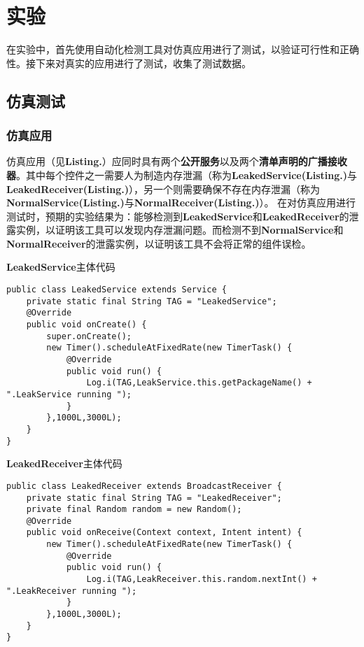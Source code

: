 
\chapter{实验}\label{chapter_experiment}

在实验中，首先使用自动化检测工具对仿真应用进行了测试，以验证可行性和正确性。接下来对真实的应用进行了测试，收集了测试数据。

\section{仿真测试}

\subsection{仿真应用}

仿真应用（见\textbf{Listing.}\redbf{\ref{code: manifest}}）应同时具有两个\textbf{公开服务}以及两个\textbf{清单声明的广播接收器}。其中每个控件之一需要人为制造内存泄漏（称为\textbf{LeakedService(Listing.\redbf{\ref{code:LeakedService}})}与\textbf{LeakedReceiver(Listing.\redbf{\ref{code:LeakedReceiver}})}），另一个则需要确保不存在内存泄漏（称为\textbf{NormalService(Listing.\redbf{\ref{code:Normal}})}与\textbf{NormalReceiver(Listing.\redbf{\ref{code:Normal}})}）。
在对仿真应用进行测试时，预期的实验结果为：能够检测到\textbf{LeakedService}和\textbf{LeakedReceiver}的泄露实例，以证明该工具可以发现内存泄漏问题。而检测不到\textbf{NormalService}和\textbf{NormalReceiver}的泄露实例，以证明该工具不会将正常的组件误检。


\begin{listing}[htbp]
	\centering
	\caption{\textbf{LeakedService}主体代码}
	\begin{verbatim}
public class LeakedService extends Service {
	private static final String TAG = "LeakedService";
	@Override
	public void onCreate() {
		super.onCreate();
		new Timer().scheduleAtFixedRate(new TimerTask() {
			@Override
			public void run() {
				Log.i(TAG,LeakService.this.getPackageName() + ".LeakService running ");
			}
		},1000L,3000L);
	}
}	
	\end{verbatim}
	\label{code:LeakedService}
\end{listing}

\begin{listing}[htbp]
	\centering
	\caption{\textbf{LeakedReceiver}主体代码}
	\begin{verbatim}
public class LeakedReceiver extends BroadcastReceiver {
	private static final String TAG = "LeakedReceiver";
	private final Random random = new Random();
	@Override
	public void onReceive(Context context, Intent intent) {
		new Timer().scheduleAtFixedRate(new TimerTask() {
			@Override
			public void run() {
				Log.i(TAG,LeakReceiver.this.random.nextInt() + ".LeakReceiver running ");
			}
		},1000L,3000L);
	}
}
	\end{verbatim}
	\label{code:LeakedReceiver}
\end{listing}

